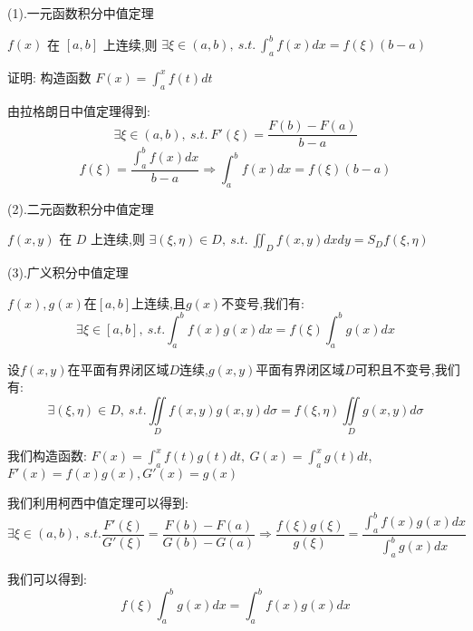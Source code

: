 \begin{theorem}[积分中值定理]

	(1).一元函数积分中值定理

	$f(x)$ 在 $[a,b]$ 上连续,则 $\exists \xi\in(a,b),\ s.t.\ \int_{a}^{b}f(x)dx=f(\xi)(b-a)$

	证明: 构造函数 $F(x)=\int_{a}^{x}f(t)dt$

	由拉格朗日中值定理得到: $$\exists \xi\in(a,b),\ s.t.\ F'(\xi)=\frac{F(b)-F(a)}{b-a}$$
	$$f(\xi)=\frac{\int_{a}^{b}f(x)dx}{b-a}\Rightarrow \int_{a}^{b}f(x)dx=f(\xi)(b-a)$$

	(2).二元函数积分中值定理

	$f(x,y)$ 在 $D$ 上连续,则 $\exists (\xi,\eta)\in D,\ s.t.\ \iint_{D}f(x,y)dxdy=S_{D}f(\xi,\eta)$

	(3).广义积分中值定理

	$f(x),g(x)$在$[a,b]$上连续,且$g(x)$不变号,我们有:
	$$\exists \xi\in[a,b],\ s.t. \int_{a}^{b}f(x)g(x)dx=f(\xi)\int_{a}^{b}g(x)dx$$

	设$f(x,y)$在平面有界闭区域$D$连续,$g(x,y)$平面有界闭区域$D$可积且不变号,我们有: $$\exists (\xi,\eta)\in D,\ s.t. \iint\limits_{D}f(x,y)g(x,y)d\sigma=f(\xi,\eta)\iint\limits_{D}g(x,y)d\sigma$$
	\begin{anymark}[注]
		我们构造函数: $F(x)=\int_{a}^{x}f(t)g(t)dt,\ G(x)=\int_{a}^{x}g(t)dt$,$F'(x) =f(x)g(x),G'(x) = g(x)$

		我们利用柯西中值定理可以得到:
		$$\exists \xi\in(a,b),\ s.t. \dfrac{F'(\xi)}{G'(\xi)}=\dfrac{F(b)-F(a)}{G(b)-G(a)}\Rightarrow \dfrac{f(\xi)g(\xi)}{g(\xi)}=\dfrac{\int_{a}^{b}f(x)g(x)dx}{\int_{a}^{b}g(x)dx}$$

		我们可以得到: $$f(\xi)\int_{a}^{b}g(x)dx=\int_{a}^{b}f(x)g(x)dx$$
	\end{anymark}
\end{theorem}

